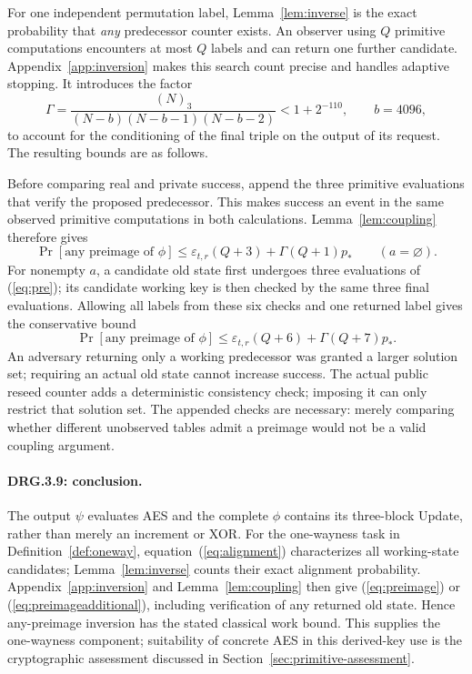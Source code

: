 \documentclass[journal=tosc,preprint,floatrow,nohyperxmp]{iacrtrans}
\numberwithin{lemma}{section}
\numberwithin{proposition}{section}
\newcommand{\fall}[2]{(#1)_{#2}}
\numberwithin{equation}{section}
\theoremstyle{definition}
\numberwithin{definition}{section}
\theoremstyle{plain}
\begin{document}
For one independent permutation label, Lemma~\ref{lem:inverse} is the exact probability that \emph{any} predecessor counter exists. An observer using $Q$ primitive computations encounters at most $Q$ labels and can return one further candidate. Appendix~\ref{app:inversion} makes this search count precise and handles adaptive stopping. It introduces the factor
\[
 \Gamma=\frac{\fall N3}{(N-b)(N-b-1)(N-b-2)}<1+2^{-110},\qquad b=4096,
\]
to account for the conditioning of the final triple on the output of its request. The resulting bounds are as follows.

Before comparing real and private success, append the three primitive evaluations that verify the proposed predecessor. This makes success an event in the same observed primitive computations in both calculations. Lemma~\ref{lem:coupling} therefore gives
\begin{equation}
 \Pr[\text{any preimage of }\phi]\le
 \varepsilon_{t,r}(Q+3)+\Gamma(Q+1)p_*\qquad(a=\varnothing).
 \label{eq:preimage}
\end{equation}
For nonempty $a$, a candidate old state first undergoes three evaluations of (\ref{eq:pre}); its candidate working key is then checked by the same three final evaluations. Allowing all labels from these six checks and one returned label gives the conservative bound
\begin{equation}
 \Pr[\text{any preimage of }\phi]\le
 \varepsilon_{t,r}(Q+6)+\Gamma(Q+7)p_* .\label{eq:preimageadditional}
\end{equation}
An adversary returning only a working predecessor was granted a larger solution set; requiring an actual old state cannot increase success. The actual public reseed counter adds a deterministic consistency check; imposing it can only restrict that solution set. The appended checks are necessary: merely comparing whether different unobserved tables admit a preimage would not be a valid coupling argument.

\paragraph{DRG.3.9: conclusion.}
The output $\psi$ evaluates AES and the complete $\phi$ contains its three-block Update, rather than merely an increment or XOR. For the one-wayness task in Definition~\ref{def:oneway}, equation~(\ref{eq:alignment}) characterizes all working-state candidates; Lemma~\ref{lem:inverse} counts their exact alignment probability. Appendix~\ref{app:inversion} and Lemma~\ref{lem:coupling} then give (\ref{eq:preimage}) or (\ref{eq:preimageadditional}), including verification of any returned old state. Hence any-preimage inversion has the stated classical work bound. This supplies the one-wayness component; suitability of concrete AES in this derived-key use is the cryptographic assessment discussed in Section~\ref{sec:primitive-assessment}.
\end{document}
